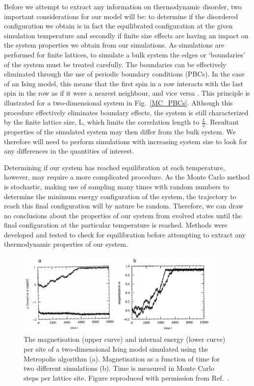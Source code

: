 \documentclass[11pt, twoside]{report}
\begin{document}
Before we attempt to extract any information on thermodynamic disorder, two important considerations for our model will be: to determine if the disordered configuration we obtain is in fact the equilibrated configuration at the given simulation temperature and secondly if finite size effects are having an impact on the system properties we obtain from our simulations.
As simulations are performed for finite lattices, to simulate a bulk system the edges or `boundaries' of the system must be treated carefully. The boundaries can be effectively eliminated through the use of periodic boundary conditions (PBCs). In the case of an Ising model, this means that the first spin in a row interacts with the last spin in the row as if it were a nearest neighbour, and vice versa \cite{MC_Landau}. This principle is illustrated for a two-dimensional system in Fig.~\ref{MC_PBCs}. Although this procedure effectively eliminates boundary effects, the system is still characterized by the finite lattice size, L, which limits the correlation length to $\frac{L}{2}$. Resultant properties of the simulated system may then differ from the bulk system. We therefore will need to perform simulations with increasing system size to look for any differences in the quantities of interest.

Determining if our system has reached equilibration at each temperature, however, may require a more complicated procedure. As the Monte Carlo method is stochastic, making use of sampling many times with random numbers to determine the minimum energy configuration of the system, the trajectory to reach this final configuration will by nature be random. Therefore, we can draw no conclusions about the properties of our system from evolved states until the final configuration at the particular temperature is reached. Methods were developed and tested to check for equilibration before attempting to extract any thermodynamic properties of our system.

\begin{figure}[h!]
  \centering
    \includegraphics[width=0.9\textwidth]{figures/ising_equil.png}
    \caption[The magnetisation (upper curve) and internal energy (lower curve) per site of a two-dimensional Ising model simulated using the Metropolis algorithm (a). Magnetisation as a function of time for two different simulations (b). Time is measured in Monte Carlo steps per lattice site.]{The magnetisation (upper curve) and internal energy (lower curve) per site of a two-dimensional Ising model simulated using the Metropolis algorithm (a). Magnetisation as a function of time for two different simulations (b). Time is measured in Monte Carlo steps per lattice site. Figure reproduced with permission from Ref.~.}
  \label{ising_equil}
\end{figure}
\end{document}
